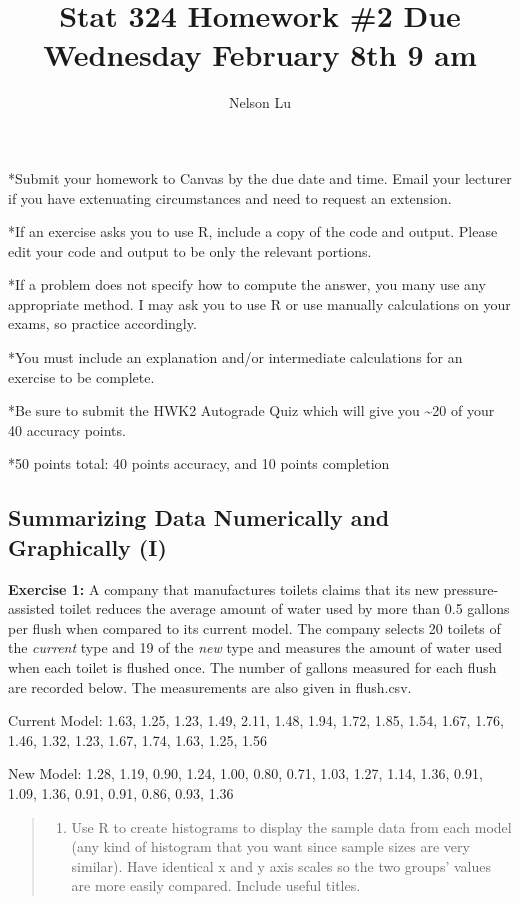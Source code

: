 \documentclass[
]{article}
\title{Stat 324 Homework \#2 Due Wednesday February 8th 9 am}
\author{Nelson Lu}
\date{}
\providecommand{\tightlist}{%
  \setlength{\itemsep}{0pt}\setlength{\parskip}{0pt}}
\begin{document}
\maketitle

*Submit your homework to Canvas by the due date and time. Email your
lecturer if you have extenuating circumstances and need to request an
extension.

*If an exercise asks you to use R, include a copy of the code and
output. Please edit your code and output to be only the relevant
portions.

*If a problem does not specify how to compute the answer, you many use
any appropriate method. I may ask you to use R or use manually
calculations on your exams, so practice accordingly.

*You must include an explanation and/or intermediate calculations for an
exercise to be complete.

*Be sure to submit the HWK2 Autograde Quiz which will give you
\textasciitilde20 of your 40 accuracy points.

*50 points total: 40 points accuracy, and 10 points completion

\hypertarget{summarizing-data-numerically-and-graphically-i}{%
\subsection{Summarizing Data Numerically and Graphically
(I)}\label{summarizing-data-numerically-and-graphically-i}}

\textbf{Exercise 1:} A company that manufactures toilets claims that its
new pressure-assisted toilet reduces the average amount of water used by
more than 0.5 gallons per flush when compared to its current model. The
company selects 20 toilets of the \emph{current} type and 19 of the
\emph{new} type and measures the amount of water used when each toilet
is flushed once. The number of gallons measured for each flush are
recorded below. The measurements are also given in flush.csv.

Current Model: 1.63, 1.25, 1.23, 1.49, 2.11, 1.48, 1.94, 1.72, 1.85,
1.54, 1.67, 1.76, 1.46, 1.32, 1.23, 1.67, 1.74, 1.63, 1.25, 1.56

New Model: 1.28, 1.19, 0.90, 1.24, 1.00, 0.80, 0.71, 1.03, 1.27, 1.14,
1.36, 0.91, 1.09, 1.36, 0.91, 0.91, 0.86, 0.93, 1.36

\begin{quote}
\begin{enumerate}
\def\labelenumi{\alph{enumi}.}
\tightlist
\item
  Use R to create histograms to display the sample data from each model
  (any kind of histogram that you want since sample sizes are very
  similar). Have identical x and y axis scales so the two groups' values
  are more easily compared. Include useful titles.
\end{enumerate}
\end{quote}
\end{document}
